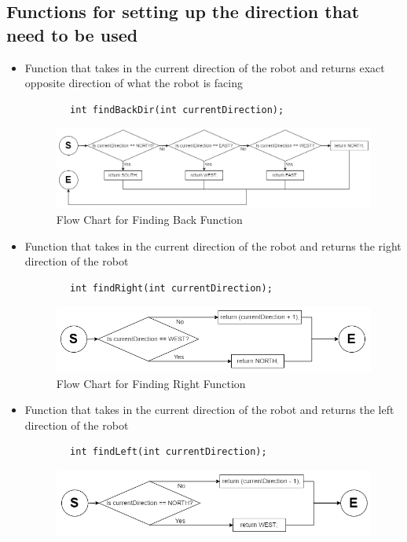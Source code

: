 \documentclass[11pt]{article}
\begin{document}

\subsection{Functions for setting up the direction that need to be used}
\begin{itemize}
\item Function that takes in the current direction of the robot and returns exact opposite direction of what the robot is facing
	\begin{verbatim}
		int findBackDir(int currentDirection);
	\end{verbatim}
\begin{figure}[htp]
\centering
\includegraphics[scale=0.45]{images/Software_Flowchart/findBackDir.png}
\caption{Flow Chart for Finding Back Function}
\label{}
\end{figure}
\item Function that takes in the current direction of the robot and returns the right direction of the robot
	\begin{verbatim}
		int findRight(int currentDirection);
	\end{verbatim}
\begin{figure}[htp]
\centering
\includegraphics[scale=0.47]{images/Software_Flowchart/findRight.png}
\caption{Flow Chart for Finding Right Function}
\label{}
\end{figure}	
\item Function that takes in the current direction of the robot and returns the left direction of the robot
	\begin{verbatim}
		int findLeft(int currentDirection);
	\end{verbatim}
\begin{figure}[htp]
\centering
\includegraphics[scale=0.48]{images/Software_Flowchart/findLeft.png}

\end{figure}
\end{itemize}
\end{document}
